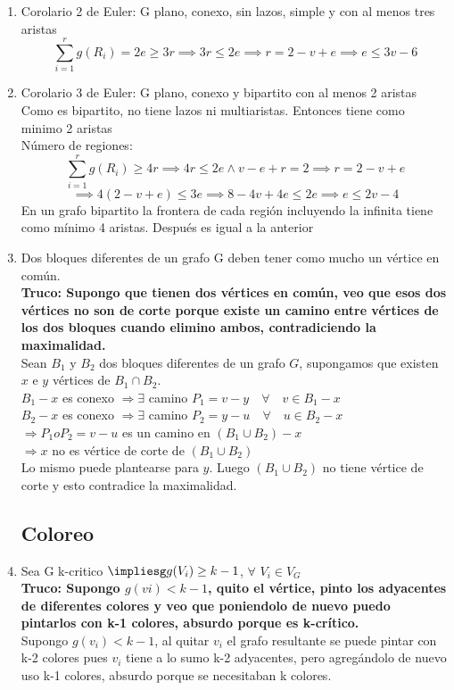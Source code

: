 \documentclass{article}
\begin{document}
\begin{enumerate}
    \item Corolario 2 de Euler: G plano, conexo, sin lazos, simple y con al menos tres aristas
    $$\sum_{i=1}^rg(R_i)=2e\geq 3r \implies 3r\leq 2e \implies r = 2-v+e\implies e\leq 3v-6$$
    
    \item Corolario 3 de Euler: G plano, conexo y bipartito con al menos 2 aristas \\
    Como es bipartito, no tiene lazos ni multiaristas. Entonces tiene como minimo 2 aristas\\
    Número de regiones:
    $$\sum_{i=1}^rg(R_i)\geq4r\implies4r\leq2e\land v-e+r=2 \implies r=2-v+e$$
    $$\implies 4(2-v+e)\leq3e\implies 8-4v+4e\leq 2e\implies e\leq 2v-4$$
    En un grafo bipartito la frontera de cada región incluyendo la infinita
    tiene como mínimo 4 aristas. Después es igual a la anterior

    \item Dos bloques diferentes de un grafo G deben tener como mucho un vértice en común. \\
    \textbf{Truco: Supongo que tienen dos vértices en común, veo que esos dos vértices no son de corte porque existe un camino entre vértices de los dos bloques cuando elimino ambos, contradiciendo la maximalidad.} \\
    Sean $B_{1}$ y $B_{2}$ dos bloques diferentes de un grafo $G$, supongamos que existen $x$ e $y$ vértices de $B_{1} \cap B_{2}$.\\ $B_{1}-x$ es conexo $\Rightarrow \exists$ camino $P_{1}=v-y \quad \forall \quad v \in B_{1}-x$ \\
    $B_{2}-x$ es conexo $\Rightarrow \exists$ camino $P_{2}=y-u \quad \forall \quad u \in B_{2}-x$ \\
    $\Rightarrow P_{1} o P_{2}=v-u$ es un camino en $\left(B_{1} \cup B_{2}\right)-x$ \\
    $\Rightarrow x$ no es vértice de corte de $\left(B_{1} \cup B_{2}\right)$ \\
    Lo mismo puede plantearse para $y$. Luego $\left(B_{1} \cup B_{2}\right)$ no tiene vértice de corte $\mathrm{y}$ esto contradice la maximalidad.
    
\subsection{Coloreo}
    \item Sea G k-critico $\impliesg g(V_i)\geq k-1$, $\forall$ $V_i\in V_G$ \\
    \textbf{Truco: Supongo $g(vi)<k-1$, quito el vértice, pinto los adyacentes de diferentes colores y veo que poniendolo de nuevo puedo pintarlos con k-1 colores, absurdo porque es k-crítico.} \\
    Supongo $g(v_i)<k-1$, al quitar $v_i$ el grafo resultante se puede pintar con k-2 colores pues $v_i$ tiene a lo sumo k-2 adyacentes, pero agregándolo de nuevo uso k-1 colores, absurdo porque se necesitaban k colores.
    

\end{enumerate}
\end{document}
